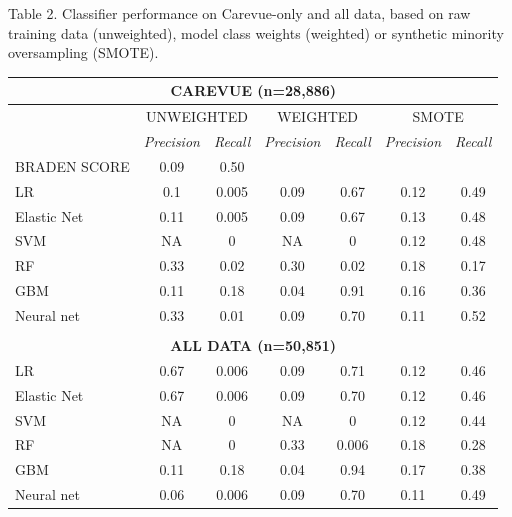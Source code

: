 \documentclass{ws-procs11x85}
\begin{document}
\begin{table}[h]
\centering
\footnotesize{ Table 2.  Classifier performance on Carevue-only and all data, based on raw training data (unweighted), model class weights (weighted) or synthetic minority oversampling (SMOTE).} 
\vspace{4mm}
\\ 
\label{tabletwo}
\begin{tabular}{@{}lcccccc@{}}
\toprule
\multicolumn{7}{c}{\cellcolor[HTML]{EFEFEF}\textbf{CAREVUE (n=28,886)}} \\ \midrule
 & \multicolumn{2}{c}{UNWEIGHTED} & \multicolumn{2}{c}{WEIGHTED} & \multicolumn{2}{c}{SMOTE} \\
 & \multicolumn{1}{l}{\textit{Precision}} & \multicolumn{1}{l}{\textit{Recall}} & \multicolumn{1}{l}{\textit{Precision}} & \multicolumn{1}{l}{\textit{Recall}} & \multicolumn{1}{l}{\textit{Precision}} & \multicolumn{1}{l}{\textit{Recall}} \\
BRADEN SCORE & 0.09 & 0.50 &  &  &  &  \\
LR & 0.1 & 0.005 & 0.09 & 0.67 & 0.12 & 0.49 \\
Elastic Net & 0.11 & 0.005 & 0.09 &  0.67 & 0.13 & 0.48 \\
SVM & NA & 0 & NA & 0 & 0.12 & 0.48 \\
RF & 0.33 & 0.02 & 0.30 & 0.02 & 0.18 & 0.17 \\
GBM & 0.11 & 0.18 & 0.04 & 0.91 & 0.16 & 0.36 \\
Neural net & 0.33 & 0.01 & 0.09 & 0.70 & 0.11 & 0.52 \\
 & \multicolumn{1}{l}{} & \multicolumn{1}{l}{} & \multicolumn{1}{l}{} & \multicolumn{1}{l}{} & \multicolumn{1}{l}{} & \multicolumn{1}{l}{} \\
\multicolumn{7}{c}{\cellcolor[HTML]{EFEFEF}\textbf{ALL DATA (n=50,851)}} \\
LR & 0.67 & 0.006 & 0.09 & 0.71 & 0.12 & 0.46 \\
Elastic Net & 0.67 & 0.006 & 0.09 & 0.70  & 0.12 &  0.46\\
SVM & NA & 0 & NA & 0 & 0.12 & 0.44 \\
RF & NA & 0 & 0.33 & 0.006 & 0.18 & 0.28 \\
GBM & 0.11 & 0.18 & 0.04 & 0.94 & 0.17 & 0.38 \\
Neural net & 0.06 & 0.006 & 0.09 & 0.70 & 0.11 & 0.49 \\ \bottomrule
\end{tabular}
\end{table}
\end{document}
